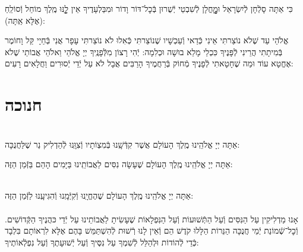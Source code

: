 \documentclass[twoside, openany, parskip=half, 11pt]{book}
\begin{document}
כִּי אַתָּה סָלְֿחָן לְֿיִשְׂרָאֵל וּמׇׇׇׇׇׇׇׇָחֳלָן לְֿשִׁבְטֵי יְֿשֻׁרוּן בְּֿכׇל־דּוֹר וָדוֹר
וּמִבַּלְעָדֶיךָ אֵין לׇׇׇׇָֽנּוּ מֶֽלֶךְ מוֹחֵל וְֿסוֹלֵֽחַ (אֶלָּא אַֽתָּה):

אֱלֹהַי עַד שֶׁלֹא נוֹצַרתִּי אֵינִי כְּֿדַאי וְֿעַכְשָׁיו שֶׁנוֹצַרתִּי כְּֿאִלוּ לֹא נוֹצַרתִּי עָפָר אֲנִי בְּֿחַיָי קַּל וָחוֹמֶר בְּֿמִיתָתִי הֲרֵינִי לְֿפָּנֶיךָ כִּכְלֵי מָלֵא בוּשָׁה וּכְלִמָה: יְֿהִי רָצוֹן מִלְּֿפָנֶֽיךָ יְיָ אֱלֹהַי וֵאלֹהֵי אֲבוֹתַי שֶׁלֹא אֶחֱטָא עוֹד וּמַה שֶׁחָטָאתִי לְֿפָנֶיךָ מְֿחוֹק בְּֿרַחֲמֶיךָ הָרַבִּים אֲבָל לֹא עַל יְֿדֵי יְֿסוּרִים וַחֲלָאִים רָעִים:

\vfill
\sepline

\chapter[חנוכה]{ חנוכה }
\label{chanukah}

\\
אַתָּה יְיָ אֱלֹהֵֽינוּ מֶֽלֶךְ הָעוֹלָם
אֲשֶׁר קִדְּֿשָֽׁנוּ בְּֿמִצְוֹתָיו וְֿצִוָּֽנוּ לְֿהַדְלִיק נֵר שֶׁלַּחֲנֻכָּה:

אַתָּה יְיָ אֱלֹהֵֽינוּ מֶֽלֶךְ הָעוֹלָם שֶׁעָשָׂה נִסִּים לַאֲבוֹתֵֽינוּ בַּיָּמִים הָהֵם בַּזְּֿמַן הַזֶּה:

\\
אַתָּה יְיָ אֱלֹהֵֽינוּ מֶֽלֶךְ הָעוֹלָם שֶׁהֶחֱיָֽנוּ וְֿקִיְּֿמָֽנוּ וְֿהִגִּיעָֽנוּ לַזְּֿמַן הַזֶּה:\\

\\
אָנוּ מַדְלִיקִין
עַל הַנִּסִּים וְֿעַל הַתְּֿשׁוּעוֹת
וְֿעַל הַנִּפְלָאוֹת
שֶׁעָשִׂיתָ לַאֲבוֹתֵינוּ
עַל יְֿדֵי כּהֲנֶיךָ הַקְּֿדוֹשִׁים.
וְֿכׇל־שְֿׁמוֹנַת יְֿמֵי חֲנֻכָּה
הַנֵּרוֹת הַלָּלוּ קֹדֶשׁ הֵם
וְֿאֵין לָנוּ רְֿשׁוּת לְֿהִשְׁתַּמֵּשׁ בָּהֶם
אֶלָּא לִרְאוֹתָם בִּלְבָד
כְּֿדֵי לְֿהוֹדוֹת וּלְהַלֵּל לְֿשִׁמְךָ
עַל נִסֶּיךָ וְֿעַל יְֿשׁוּעָתֶךָ
וְֿעַל נִפְלְֿאוֹתֶיךָ:
\end{document}
